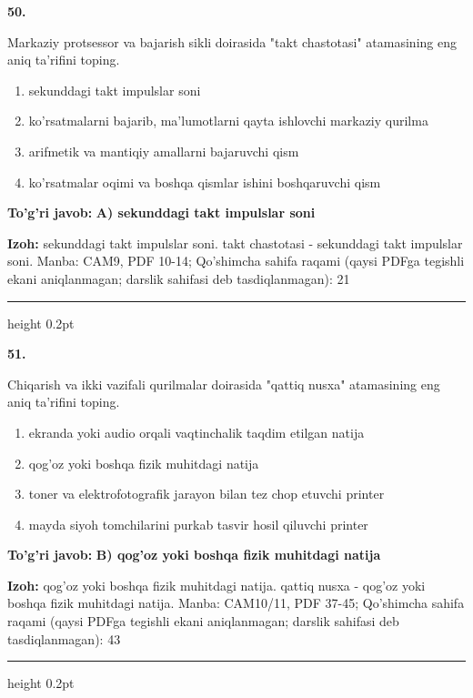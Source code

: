\documentclass[10pt,a4paper]{article}
\begin{document}
{\bfseries\sffamily\color{ink} 50.}
\par
Markaziy protsessor va bajarish sikli doirasida "takt chastotasi" atamasining eng aniq ta'rifini toping.
\begin{enumerate}[label=\Alph*),leftmargin=9mm]
\item sekunddagi takt impulslar soni
\item ko'rsatmalarni bajarib, ma'lumotlarni qayta ishlovchi markaziy qurilma
\item arifmetik va mantiqiy amallarni bajaruvchi qism
\item ko'rsatmalar oqimi va boshqa qismlar ishini boshqaruvchi qism
\end{enumerate}
\begin{tcolorbox}[enhanced,breakable,colback=teal!4,colframe=teal!60!black,boxrule=0.45pt,arc=1.2mm,left=2.7mm,right=2.7mm,top=1.8mm,bottom=1.8mm,before skip=2mm,after skip=2mm]
{\bfseries\sffamily\color{teal}To'g'ri javob:} \textbf{A) sekunddagi takt impulslar soni}
\par\smallskip
{\bfseries Izoh:} sekunddagi takt impulslar soni. takt chastotasi - sekunddagi takt impulslar soni. Manba: CAM9, PDF 10-14; Qo'shimcha sahifa raqami (qaysi PDFga tegishli ekani aniqlanmagan; darslik sahifasi deb tasdiqlanmagan): 21
\end{tcolorbox}
\vspace{2mm}\hrule height 0.2pt\vspace{3mm}

{\bfseries\sffamily\color{ink} 51.}
\par
Chiqarish va ikki vazifali qurilmalar doirasida "qattiq nusxa" atamasining eng aniq ta'rifini toping.
\begin{enumerate}[label=\Alph*),leftmargin=9mm]
\item ekranda yoki audio orqali vaqtinchalik taqdim etilgan natija
\item qog'oz yoki boshqa fizik muhitdagi natija
\item toner va elektrofotografik jarayon bilan tez chop etuvchi printer
\item mayda siyoh tomchilarini purkab tasvir hosil qiluvchi printer
\end{enumerate}
\begin{tcolorbox}[enhanced,breakable,colback=teal!4,colframe=teal!60!black,boxrule=0.45pt,arc=1.2mm,left=2.7mm,right=2.7mm,top=1.8mm,bottom=1.8mm,before skip=2mm,after skip=2mm]
{\bfseries\sffamily\color{teal}To'g'ri javob:} \textbf{B) qog'oz yoki boshqa fizik muhitdagi natija}
\par\smallskip
{\bfseries Izoh:} qog'oz yoki boshqa fizik muhitdagi natija. qattiq nusxa - qog'oz yoki boshqa fizik muhitdagi natija. Manba: CAM10/11, PDF 37-45; Qo'shimcha sahifa raqami (qaysi PDFga tegishli ekani aniqlanmagan; darslik sahifasi deb tasdiqlanmagan): 43
\end{tcolorbox}
\vspace{2mm}\hrule height 0.2pt\vspace{3mm}
\end{document}
